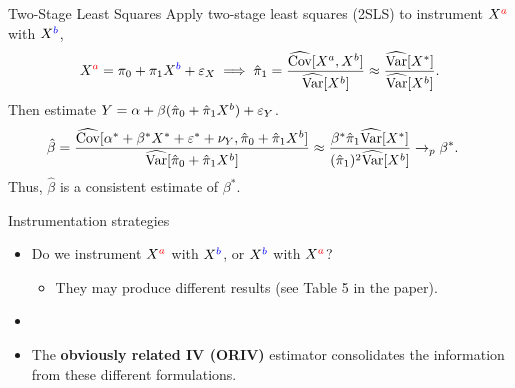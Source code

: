 \begin{frame}{Two-Stage Least Squares}
    Apply two-stage least squares (2SLS) to instrument $X^{\color{red}a}$ with $X^{\color{blue}b}$,
    \[
    X^{\color{red}a} = \pi_{0} + \pi_{1}X^{\color{blue}b} + \varepsilon_{X}
    \implies \hat{\pi}_{1} = \frac{\widehat{\text{Cov}}[X^{a},X^{b}]}{\widehat{\text{Var}}[X^{b}]}
    \approx \frac{\widehat{\text{Var}}[X^{*}]}{\widehat{\text{Var}}[X^{b}]}.
    \]
    Then estimate $Y=\alpha + \beta (\hat{\pi}_{0} + \hat{\pi}_{1}X^{b}) + \varepsilon_{Y}$.
    \begin{equation*}\begin{split}
    \hat{\beta}
    &= \frac{\widehat{\text{Cov}}[\alpha^{*}+\beta^{*}X^{*} + \varepsilon^{*} + \nu_{Y},\hat{\pi}_{0} + \hat{\pi}_{1}X^{b}]}{\widehat{\text{Var}}[\hat{\pi}_{0} + \hat{\pi}_{1}X^{b}]}
    \approx
    \frac{\beta^{*} \hat{\pi}_{1} \widehat{\text{Var}}[X^{*}]}{(\hat{\pi}_{1})^{2} \widehat{\text{Var}}[X^{b}]}
    \rightarrow_{p} \beta^{*}.
    \end{split}
    \end{equation*}
    Thus, $\hat{\beta}$ is a consistent estimate of $\beta^{*}$.
\end{frame}

\begin{frame}{Instrumentation strategies}
    \begin{itemize}
        \item[Q.] Do we instrument $X^{\color{red}a}$ with $X^{\color{blue}b}$, or $X^{\color{blue}b}$ with $X^{\color{red}a}$?
        \begin{itemize}
            \item They may produce different results (see Table 5 in the paper).
        \end{itemize}
        \item[]
        \item[A.] The \textbf{obviously related IV (ORIV)} estimator consolidates the information from these different formulations.
    \end{itemize}
\end{frame}

